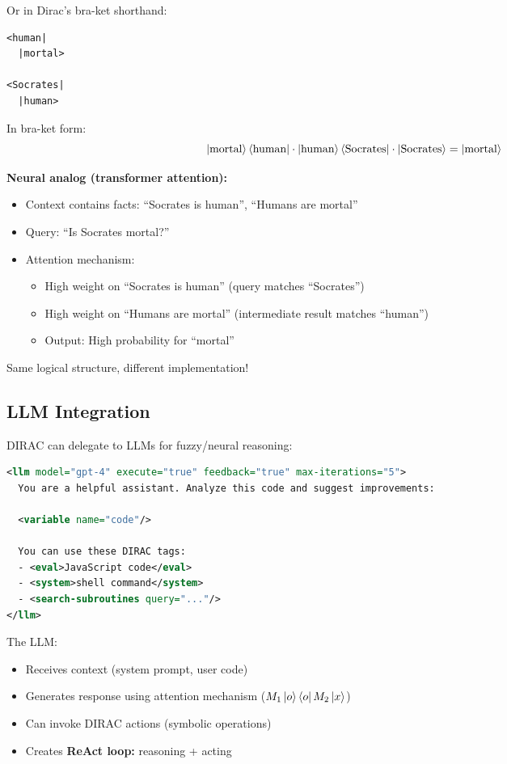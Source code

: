 \documentclass[11pt,a4paper]{article}
\theoremstyle{definition}
\begin{document}
Or in Dirac's bra-ket shorthand:
\begin{lstlisting}
<human|
  |mortal>
  
<Socrates|
  |human>
\end{lstlisting}

In bra-ket form:
\begin{equation}
\ket{\text{mortal}}\bra{\text{human}} \cdot \ket{\text{human}}\bra{\text{Socrates}} \cdot \ket{\text{Socrates}} = \ket{\text{mortal}}
\end{equation}

\textbf{Neural analog (transformer attention):}
\begin{itemize}
\item Context contains facts: ``Socrates is human'', ``Humans are mortal''
\item Query: ``Is Socrates mortal?''
\item Attention mechanism:
\begin{itemize}
\item High weight on ``Socrates is human'' (query matches ``Socrates'')
\item High weight on ``Humans are mortal'' (intermediate result matches ``human'')
\item Output: High probability for ``mortal''
\end{itemize}
\end{itemize}

Same logical structure, different implementation!

\subsection{LLM Integration}

DIRAC can delegate to LLMs for fuzzy/neural reasoning:

\begin{lstlisting}[language=XML]
<llm model="gpt-4" execute="true" feedback="true" max-iterations="5">
  You are a helpful assistant. Analyze this code and suggest improvements:
  
  <variable name="code"/>
  
  You can use these DIRAC tags:
  - <eval>JavaScript code</eval>
  - <system>shell command</system>
  - <search-subroutines query="..."/> 
</llm>
\end{lstlisting}

The LLM:
\begin{itemize}
\item Receives context (system prompt, user code)
\item Generates response using attention mechanism ($M_1 \ket{o}\bra{o} M_2 \ket{x}$)
\item Can invoke DIRAC actions (symbolic operations)
\item Creates \textbf{ReAct loop:} reasoning + acting
\end{itemize}
\end{document}
